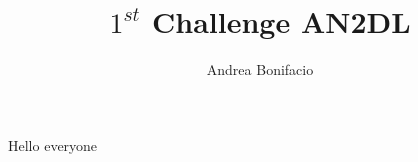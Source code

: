 \documentclass[a4paper,12pt]{article}
\numberwithin{equation}{section}
\begin{document}
\title{\(1^{st}\) Challenge AN2DL}
\author{Andrea Bonifacio}
\maketitle
    Hello everyone
\end{document}
